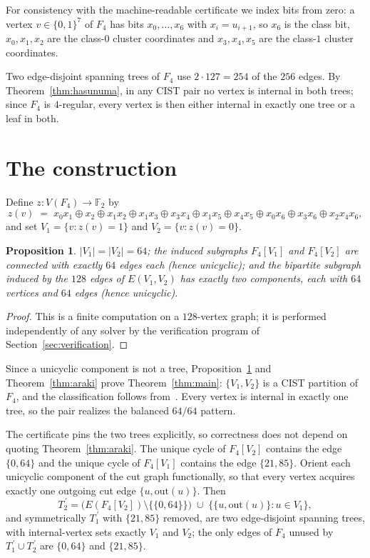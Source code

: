 \documentclass[10pt,a4paper]{amsart}
\newtheorem{proposition}{Proposition}
\begin{document}
For consistency with the machine-readable certificate we index bits from
zero: a vertex $v\in\{0,1\}^7$ of $F_4$ has bits $x_0,\dots,x_6$ with
$x_i=u_{i+1}$, so $x_6$ is the class bit, $x_0,x_1,x_2$ are the class-$0$
cluster coordinates and $x_3,x_4,x_5$ are the class-$1$ cluster
coordinates.

Two edge-disjoint spanning trees of $F_4$ use $2\cdot 127=254$ of the $256$
edges. By Theorem~\ref{thm:hasunuma}, in any CIST pair no vertex is
internal in both trees; since $F_4$ is $4$-regular, every vertex is then
either internal in exactly one tree or a leaf in both.

\section{The construction}\label{sec:construction}

Define $z\colon V(F_4)\to\mathbb{F}_2$ by
\begin{equation}\label{eq:anf}
z(v) \;=\; x_0x_1 \oplus x_2 \oplus x_1x_2 \oplus x_1x_3 \oplus x_3x_4
\oplus x_1x_5 \oplus x_4x_5 \oplus x_0x_6 \oplus x_3x_6 \oplus x_2x_4x_6,
\end{equation}
and set $V_1=\{v : z(v)=1\}$ and $V_2=\{v : z(v)=0\}$.


\begin{proposition}\label{prop:partition}
$|V_1|=|V_2|=64$; the induced subgraphs $F_4[V_1]$ and $F_4[V_2]$ are
connected with exactly $64$ edges each (hence unicyclic); and the bipartite
subgraph induced by the $128$ edges of $E(V_1,V_2)$ has exactly two
components, each with $64$ vertices and $64$ edges (hence unicyclic).
\end{proposition}

\begin{proof}
This is a finite computation on a $128$-vertex graph; it is performed
independently of any solver by the verification program of
Section~\ref{sec:verification}.
\end{proof}


Since a unicyclic component is not a tree, Proposition~\ref{prop:partition}
and Theorem~\ref{thm:araki} prove Theorem~\ref{thm:main}: $\{V_1,V_2\}$ is
a CIST partition of $F_4$, and the classification follows
from~\cite{Lalou2026}. Every vertex is internal in exactly one tree, so the
pair realizes the balanced $64/64$ pattern.

The certificate pins the two trees explicitly, so correctness does not
depend on quoting Theorem~\ref{thm:araki}. The unique cycle of $F_4[V_2]$
contains the edge $\{0,64\}$ and the unique cycle of $F_4[V_1]$ contains
the edge $\{21,85\}$. Orient each unicyclic component of the cut graph
functionally, so that every vertex acquires exactly one outgoing cut edge
$\{u,\mathrm{out}(u)\}$. Then
\[
T_2^{\,\prime} = \bigl(E(F_4[V_2])\setminus\{\{0,64\}\}\bigr)\;\cup\;
\bigl\{\{u,\mathrm{out}(u)\} : u\in V_1\bigr\},
\]
and symmetrically $T_1^{\,\prime}$ with $\{21,85\}$ removed, are two
edge-disjoint spanning trees, with internal-vertex sets exactly $V_1$ and
$V_2$; the only edges of $F_4$ unused by $T_1^{\,\prime}\cup
T_2^{\,\prime}$ are $\{0,64\}$ and $\{21,85\}$.
\end{document}
